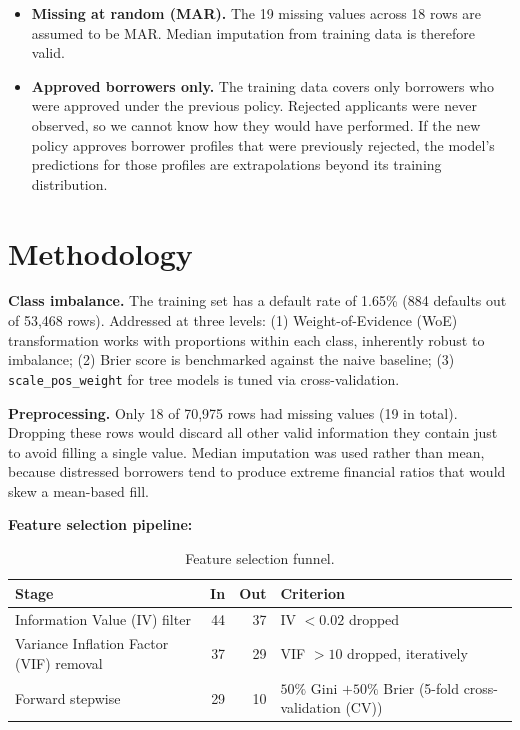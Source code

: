 \documentclass[a4paper,11pt]{article}
\begin{document}
\begin{itemize}[leftmargin=1.5em]
  \item \textbf{Missing at random (MAR).} The 19 missing values across 18 rows
        are assumed to be MAR. Median imputation from training data is therefore valid.

  \item \textbf{Approved borrowers only.} The training data covers only borrowers
        who were approved under the previous policy. Rejected applicants were never
        observed, so we cannot know how they would have performed. If the new policy
        approves borrower profiles that were previously rejected, the model's
        predictions for those profiles are extrapolations beyond its training distribution.
\end{itemize}

\section{Methodology}

\textbf{Class imbalance.} The training set has a default rate of 1.65\%
(884 defaults out of 53{,}468 rows). Addressed at three levels:
(1) Weight-of-Evidence (WoE) transformation works with proportions within each class, inherently
robust to imbalance;
(2) Brier score is benchmarked against the naive baseline;
(3) \texttt{scale\_pos\_weight} for tree models is tuned via cross-validation.

\textbf{Preprocessing.} Only 18 of 70{,}975 rows had missing values (19 in total).
Dropping these rows would discard all other valid information they contain just to
avoid filling a single value. Median imputation was used rather than mean, because
distressed borrowers tend to produce extreme financial ratios that would skew a
mean-based fill.

\textbf{Feature selection pipeline:}

\begin{table}[H]
\centering
\begin{tabular}{L{3cm} r r L{8cm}}
\toprule
\textbf{Stage} & \textbf{In} & \textbf{Out} & \textbf{Criterion} \\
\midrule
Information Value (IV) filter        & 44 & 37 & IV $< 0.02$ dropped \\
Variance Inflation Factor (VIF) removal      & 37 & 29 & VIF $> 10$ dropped, iteratively \\
Forward stepwise & 29 & 10 & $50\%$ Gini $+ 50\%$ Brier (5-fold cross-validation (CV)) \\
\bottomrule
\end{tabular}
\caption{Feature selection funnel.}
\end{table}
\end{document}
